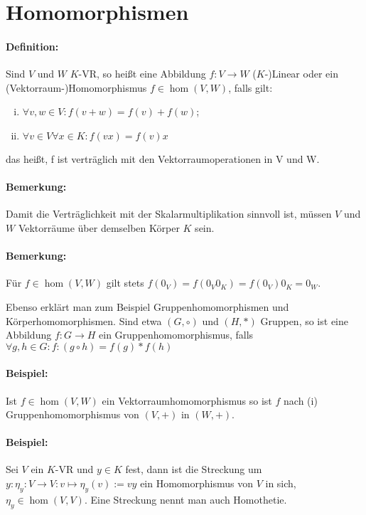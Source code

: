 \section{Homomorphismen}
\paragraph{Definition:}
	Sind $ V $ und $ W $ $ K $-VR, so heißt eine Abbildung $f: V \rightarrow W$ ($ K $-)Linear oder ein (Vektorraum-)Homomorphismus $f\in \hom(V,W)$, falls gilt:

\begin{enumerate}[(i)]
	\item $\forall v,w \in V: f(v+w) = f(v) + f(w)$;
	\item $\forall v\in V \forall x\in K: f(vx) = f(v)x$
\end{enumerate}

    das heißt, f ist verträglich mit den Vektorraumoperationen in V und W.
    
\paragraph{Bemerkung:}
	Damit die Verträglichkeit mit der Skalarmultiplikation sinnvoll ist, müssen $ V $ und $ W $ Vektorräume über demselben Körper $ K $ sein.
\paragraph{Bemerkung:}
	Für $f\in \hom(V,W)$ gilt stets $f(0_V) = f(0_V0_K) = f(0_V)0_K = 0_W$.
  
  Ebenso erklärt man zum Beispiel Gruppenhomomorphismen und Körperhomomorphismen. Sind etwa $(G,\circ)$ und $(H,*)$ Gruppen, so ist eine Abbildung $f: G \to H$ ein Gruppenhomomorphismus, falls $\forall g,h \in G: f:(g\circ h) = f(g) * f(h)$
  
\paragraph{Beispiel:}
	Ist $f\in \hom(V,W)$ ein Vektorraumhomomorphismus so ist $ f $ nach (i) Gruppenhomomorphismus von $ (V,+) $ in $ (W,+) $.
  
\paragraph{Beispiel:}
	Sei $ V $ ein $ K $-VR und $y\in K$ fest, dann ist die Streckung um $y: \eta_y:V\to V: v\mapsto \eta_y(v) := vy$ ein Homomorphismus von $ V $ in sich, $\eta_y\in \hom(V,V)$. Eine Streckung nennt man auch Homothetie.
  	
